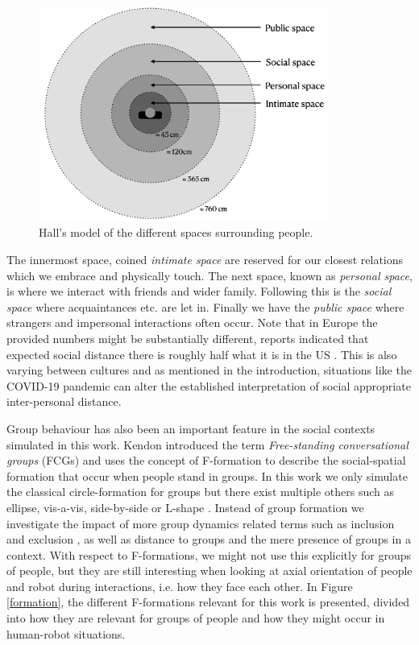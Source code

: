 \documentclass[a4paper,12pt]{report}
\begin{document}
\begin{figure}[h]
\centering
\includegraphics[width=9.5cm]{figs/personal_space.png}
\caption{Hall's model of the different spaces surrounding people.}
\label{personal}
\end{figure}

The innermost space, coined \textit{intimate space} are reserved for our closest relations which we embrace and physically touch. The next space, known as \textit{personal space}, is where we interact with friends and wider family. Following this is the \textit{social space} where acquaintances etc. are let in. Finally we have the \textit{public space} where strangers and impersonal interactions often occur. Note that in Europe the provided numbers might be substantially different, reports indicated that expected social distance there is roughly half what it is in the US \cite{hall1969hidden}. This is also varying between cultures and as mentioned in the introduction, situations like the COVID-19 pandemic can alter the established interpretation of social appropriate inter-personal distance.


Group behaviour has also been an important feature in the  social contexts simulated in this work. Kendon \cite{kendon1990conducting} introduced the term \textit{Free-standing conversational groups} (FCGs)  and uses the concept of F-formation to describe the social-spatial formation that occur when people stand in groups. In this work we only simulate the classical circle-formation for groups but there exist multiple others such as ellipse, vis-a-vis, side-by-side or L-shape \cite{setti2015f}. Instead of group formation we investigate the impact of more group dynamics related terms such as inclusion and exclusion \cite{forsyth2018group}, as well as distance to groups and the mere presence of groups in a context. With respect to F-formations, we might not use this explicitly for groups of people, but they are still interesting when looking at axial orientation of people and robot during interactions, i.e. how they face each other. In Figure \ref{formation}, the different F-formations relevant for this work is presented, divided into how they are relevant for groups of people and how they might occur in human-robot situations.
\end{document}
